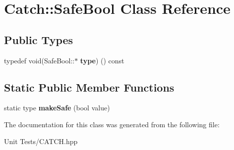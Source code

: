 \hypertarget{classCatch_1_1SafeBool}{}\section{Catch\+:\+:Safe\+Bool Class Reference}
\label{classCatch_1_1SafeBool}
\subsection*{Public Types}
\begin{DoxyCompactItemize}
\item 
typedef void(Safe\+Bool\+::$\ast$ {\bfseries type}) () const \hypertarget{classCatch_1_1SafeBool_a852cdacb020a98edeee0f4da4cf790d5}{}\label{classCatch_1_1SafeBool_a852cdacb020a98edeee0f4da4cf790d5}

\end{DoxyCompactItemize}
\subsection*{Static Public Member Functions}
\begin{DoxyCompactItemize}
\item 
static type {\bfseries make\+Safe} (bool value)\hypertarget{classCatch_1_1SafeBool_af0ea63d9820f8bf7a8b76377913c4e77}{}\label{classCatch_1_1SafeBool_af0ea63d9820f8bf7a8b76377913c4e77}

\end{DoxyCompactItemize}


The documentation for this class was generated from the following file\+:\begin{DoxyCompactItemize}
\item 
Unit Tests/C\+A\+T\+C\+H.\+hpp\end{DoxyCompactItemize}
